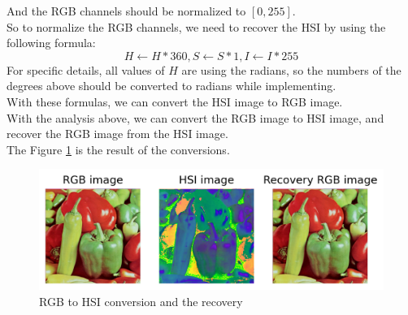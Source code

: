 And the RGB channels should be normalized to $[0,255]$.\\
So to normalize the RGB channels, we need to recover the HSI by using the following formula:
$$H \gets H*360, S \gets S*1, I \gets I * 255$$
For specific details, all values of $H$ are using the radians, so the numbers of the degrees above should be converted to radians while implementing.\\
With these formulas, we can convert the HSI image to RGB image.\\
With the analysis above, we can convert the RGB image to HSI image, and recover the RGB image from the HSI image.\\
The Figure \ref{fig:p3} is the result of the conversions.\\

\begin{figure}[htbp]
    \centering
	\includegraphics[width=\textwidth]{../images/p3/p3.png}
    \caption{RGB to HSI conversion and the recovery}
    \label{fig:p3}
\end{figure}
\newpage